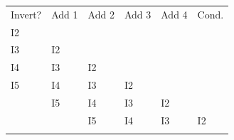 \documentclass[a4paper, 11pt]{article}
\begin{document}
                \begin{figure}
                    \centering

                    \begin{tabularx}{\textwidth}{
                        |>{\centering\arraybackslash}X
                        |>{\centering\arraybackslash}X
                        |>{\centering\arraybackslash}X
                        |>{\centering\arraybackslash}X
                        |>{\centering\arraybackslash}X
                        |>{\centering\arraybackslash}X
                        |
                        }

                        \hhline{------}
                        Invert? &Add 1  &Add 2  &Add 3  &Add 4  &Cond.  \\
                        \hhline{|-|-|-|-|-|-|}

                        \rowcolor{lightgray}
                        \cellcolor{violet!50!white}I2   &   &   &   &   &   \\  \hhline{|-|-|-|-|-|-|}

                        \rowcolor{lightgray}
                        \cellcolor{violet!20!white}I3   &\cellcolor{violet!50!white}I2 &   &   &   &   \\  \hhline{|-|-|-|-|-|-|}

                        \rowcolor{lightgray}
                        \cellcolor{green!20!white}I4    &\cellcolor{violet!20!white}I3 &\cellcolor{violet!50!white}I2 &   &   &   \\  \hhline{|-|-|-|-|-|-|}

                        \rowcolor{lightgray}
                        \cellcolor{green!50!white}I5    &\cellcolor{green!20!white}I4 &\cellcolor{violet!20!white}I3 &\cellcolor{violet!50!white}I2 &   &   \\  \hhline{|-|-|-|-|-|-|}

                        \rowcolor{lightgray}
                            &\cellcolor{green!50!white}I5 &\cellcolor{green!20!white}I4 &\cellcolor{violet!20!white}I3 &\cellcolor{violet!50!white}I2 &   \\  \hhline{|-|-|-|-|-|-|}

                        \rowcolor{lightgray}
                            &   &\cellcolor{green!50!white}I5 &\cellcolor{green!20!white}I4 &\cellcolor{violet!20!white}I3 &\cellcolor{violet!50!white}I2 \\  \hhline{|-|-|-|-|-|-|}


\end{tabularx}
\end{figure}
\end{document}
